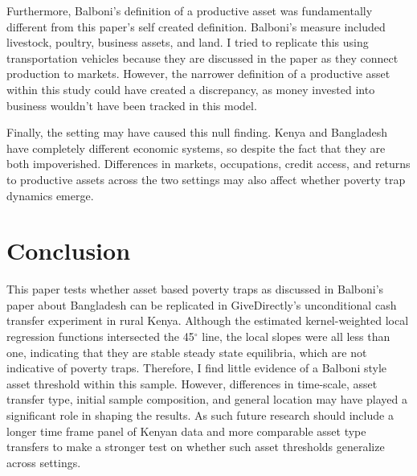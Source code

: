 \documentclass[9pt,twoside]{pnas-new}
\begin{document}
Furthermore, Balboni's definition of a productive asset was fundamentally different from this paper's self created definition. Balboni's measure included livestock, poultry, business assets, and land. I tried to replicate this using transportation vehicles because they are discussed in the paper as they connect production to markets. However, the narrower definition of a productive asset within this study could have created a discrepancy, as money invested into business wouldn't have been tracked in this model.


Finally,
the setting may have caused this null finding. Kenya and Bangladesh have completely different
economic systems, so despite the fact that they are both impoverished. Differences in markets, occupations, credit access, and returns to productive assets across the two settings may also affect whether poverty trap dynamics emerge.



\section{Conclusion}

This paper tests whether asset based poverty traps as discussed in Balboni's paper about
Bangladesh can be replicated in GiveDirectly's unconditional cash transfer experiment in rural
Kenya. Although the estimated kernel-weighted local regression functions intersected the 45$^\circ$
line, the local slopes were all less than one, indicating that they are stable steady state
equilibria, which are not indicative of poverty traps. Therefore, I find little evidence of a
Balboni style asset threshold within this sample. However, differences in time-scale, asset
transfer type, initial sample composition, and general location may have played a significant role
in shaping the results. As such future research should include a longer time frame panel of
Kenyan data and more comparable asset type transfers to make a stronger test on whether such
asset thresholds generalize across settings.






%
\end{document}
